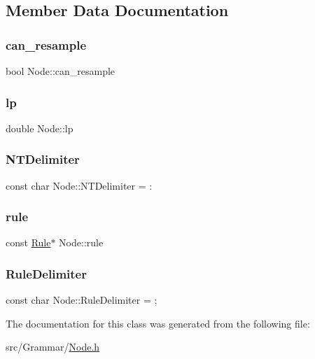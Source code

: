 \subsection{Member Data Documentation}
\mbox{\label{class_node_a98c14a51b240fbc7e438f40a12276257}} 
\subsubsection{\texorpdfstring{can\+\_\+resample}{can\_resample}}
{\footnotesize\ttfamily bool Node\+::can\+\_\+resample}

\mbox{\label{class_node_a298eaa3743b774a3f9ef396e1dc42a08}} 
\subsubsection{\texorpdfstring{lp}{lp}}
{\footnotesize\ttfamily double Node\+::lp}

\mbox{\label{class_node_abd26102ffbe2a3e00c34bed5508b3234}} 
\subsubsection{\texorpdfstring{N\+T\+Delimiter}{NTDelimiter}}
{\footnotesize\ttfamily const char Node\+::\+N\+T\+Delimiter = \textquotesingle{}\+:\textquotesingle{}\hspace{0.3cm}{\ttfamily [static]}}

\mbox{\label{class_node_a02f5c9463cceb270ad5730760f19c722}} 
\subsubsection{\texorpdfstring{rule}{rule}}
{\footnotesize\ttfamily const \hyperlink{class_rule}{Rule}$\ast$ Node\+::rule}

\mbox{\label{class_node_ab58932e82964fb75ba806870c4069dc2}} 
\subsubsection{\texorpdfstring{Rule\+Delimiter}{RuleDelimiter}}
{\footnotesize\ttfamily const char Node\+::\+Rule\+Delimiter = \textquotesingle{};\textquotesingle{}\hspace{0.3cm}{\ttfamily [static]}}



The documentation for this class was generated from the following file\+:\begin{DoxyCompactItemize}
\item 
src/\+Grammar/\hyperlink{_node_8h}{Node.\+h}\end{DoxyCompactItemize}
